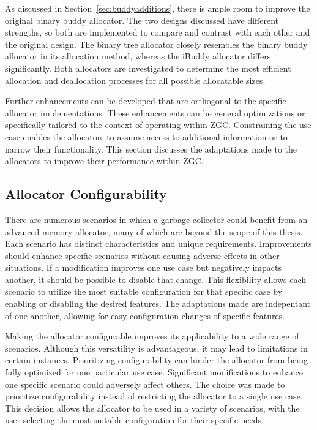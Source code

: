 As discussed in Section~\ref{sec:buddyadditions}, there is ample room to improve the original binary buddy allocator. The two designs discussed have different strengths, so both are implemented to compare and contrast with each other and the original design. The binary tree allocator closely resembles the binary buddy allocator in its allocation method, whereas the iBuddy allocator differs significantly. Both allocators are investigated to determine the most efficient allocation and deallocation processes for all possible allocatable sizes.

Further enhancements can be developed that are orthogonal to the specific allocator implementations. These enhancements can be general optimizations or specifically tailored to the context of operating within ZGC. Constraining the use case enables the allocators to assume access to additional information or to narrow their functionality. This section discusses the adaptations made to the allocators to improve their performance within ZGC.

\subsection{Allocator Configurability} \label{sec:adaptationsconfig}
There are numerous scenarios in which a garbage collector could benefit from an advanced memory allocator, many of which are beyond the scope of this thesis. Each scenario has distinct characteristics and unique requirements. Improvements should enhance specific scenarios without causing adverse effects in other situations.
If a modification improves one use case but negatively impacts another, it should be possible to disable that change. This flexibility allows each scenario to utilize the most suitable configuration for that specific case by enabling or disabling the desired features. The adaptations made are indepentant of one another, allowing for easy configuration changes of specific features.

Making the allocator configurable improves its applicability to a wide range of scenarios. Although this versatility is advantageous, it may lead to limitations in certain instances. Prioritizing configurability can hinder the allocator from being fully optimized for one particular use case. Significant modifications to enhance one specific scenario could adversely affect others. The choice was made to prioritize configurability instead of restricting the allocator to a single use case. This decision allows the allocator to be used in a variety of scenarios, with the user selecting the most suitable configuration for their specific needs.

